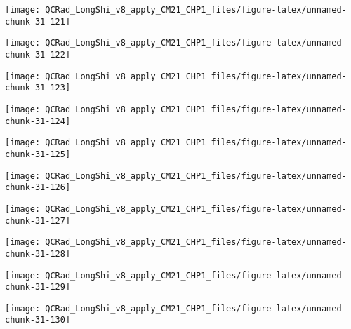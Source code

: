 \documentclass[
  10pt,
  a4paper,oneside]{article}
\begin{document}
\begin{center}\texttt{[image: QCRad\_LongShi\_v8\_apply\_CM21\_CHP1\_files/figure-latex/unnamed-chunk-31-121]} \end{center}

\begin{center}\texttt{[image: QCRad\_LongShi\_v8\_apply\_CM21\_CHP1\_files/figure-latex/unnamed-chunk-31-122]} \end{center}

\begin{center}\texttt{[image: QCRad\_LongShi\_v8\_apply\_CM21\_CHP1\_files/figure-latex/unnamed-chunk-31-123]} \end{center}

\begin{center}\texttt{[image: QCRad\_LongShi\_v8\_apply\_CM21\_CHP1\_files/figure-latex/unnamed-chunk-31-124]} \end{center}

\begin{center}\texttt{[image: QCRad\_LongShi\_v8\_apply\_CM21\_CHP1\_files/figure-latex/unnamed-chunk-31-125]} \end{center}

\begin{center}\texttt{[image: QCRad\_LongShi\_v8\_apply\_CM21\_CHP1\_files/figure-latex/unnamed-chunk-31-126]} \end{center}

\begin{center}\texttt{[image: QCRad\_LongShi\_v8\_apply\_CM21\_CHP1\_files/figure-latex/unnamed-chunk-31-127]} \end{center}

\begin{center}\texttt{[image: QCRad\_LongShi\_v8\_apply\_CM21\_CHP1\_files/figure-latex/unnamed-chunk-31-128]} \end{center}

\begin{center}\texttt{[image: QCRad\_LongShi\_v8\_apply\_CM21\_CHP1\_files/figure-latex/unnamed-chunk-31-129]} \end{center}

\begin{center}\texttt{[image: QCRad\_LongShi\_v8\_apply\_CM21\_CHP1\_files/figure-latex/unnamed-chunk-31-130]} \end{center}
\end{document}
